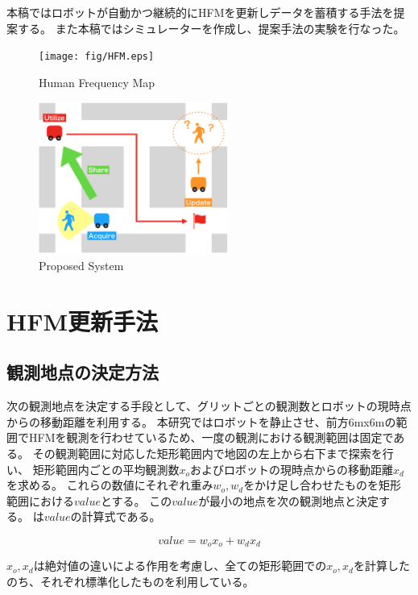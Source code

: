 \documentclass{jsarticle}
\begin{document}
本稿ではロボットが自動かつ継続的にHFMを更新しデータを蓄積する手法を提案する。
また本稿ではシミュレーターを作成し、提案手法の実験を行なった。
\begin{figure}[tbh]
 \centering
  \texttt{[image: fig/HFM.eps]}
  \vspace*{-4mm}
  \caption{Human Frequency Map}
  \label{fig: HFM}
\end{figure}

\begin{figure}[tbh]
 \centering
  \includegraphics[height=50mm]{fig/proposedsystem.eps}
  \vspace*{-4mm}
  \caption{Proposed System}
  \label{fig: proposedsystem}
\end{figure}

\section{HFM更新手法}
\subsection{観測地点の決定方法}
\label{decide}
次の観測地点を決定する手段として、グリットごとの観測数とロボットの現時点からの移動距離を利用する。
本研究ではロボットを静止させ、前方6mx6mの範囲でHFMを観測を行わせているため、一度の観測における観測範囲は固定である。
その観測範囲に対応した矩形範囲内で地図の左上から右下まで探索を行い、
矩形範囲内ごとの平均観測数$x_{o}$およびロボットの現時点からの移動距離$x_{d}$を求める。
これらの数値にそれぞれ重み$w_{o},w_{d}$をかけ足し合わせたものを矩形範囲における$value$とする。
この$value$が最小の地点を次の観測地点と決定する。
は$value$の計算式である。

\begin{equation}
  value = w_{o}x_{o} + w_{d}x_{d}
	\label{eqn: value}
\end{equation}

$x_o,x_d$は絶対値の違いによる作用を考慮し、全ての矩形範囲での$x_o,x_d$を計算したのち、それぞれ標準化したものを利用している。
\end{document}
